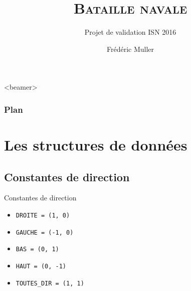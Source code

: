 

\usepackage{pmboxdraw}
\usepackage{newunicodechar}

\newcommand\modulo[2]{\@tempcnta=#1
        \divide\@tempcnta by #2
        \multiply\@tempcnta by #2
        \multiply\@tempcnta by -1
        \advance\@tempcnta by #1\relax
        \the\@tempcnta}




\title[Bataille navale]{\textsc{Bataille navale}}
\subtitle{Projet de validation ISN 2016}
\author{Frédéric Muller}
\date{}

\AtBeginSubsection[]
{
  \begin{frame}<beamer>
    \frametitle{Plan}
    \tableofcontents[currentsection,currentsubsection,    subsubsectionstyle=hide]
  \end{frame}
}





\begin{frame}
\titlepage
\end{frame}

\section{Les structures de données}
\subsection{Constantes de direction}
\begin{frame}{Constantes de direction}
\begin{itemize}
\item \texttt{DROITE = (1, 0)} 
\item \texttt{GAUCHE = (-1, 0)}
\item \texttt{BAS = (0, 1)}
\item \texttt{HAUT = (0, -1)}
\item \texttt{TOUTES\_DIR = (1, 1)}
\end{itemize}
\end{frame}


